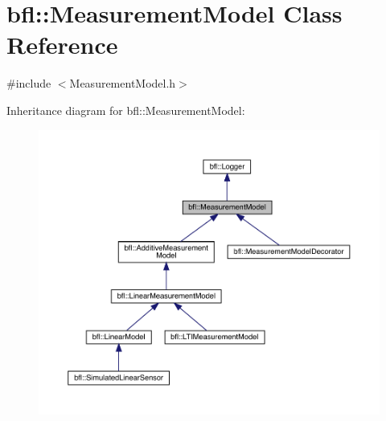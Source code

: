 \hypertarget{classbfl_1_1MeasurementModel}{}\section{bfl\+:\+:Measurement\+Model Class Reference}
\label{classbfl_1_1MeasurementModel}


{\ttfamily \#include $<$Measurement\+Model.\+h$>$}



Inheritance diagram for bfl\+:\+:Measurement\+Model\+:
\nopagebreak
\begin{figure}[H]
\begin{center}
\leavevmode
\includegraphics[width=350pt]{classbfl_1_1MeasurementModel__inherit__graph}
\end{center}
\end{figure}
